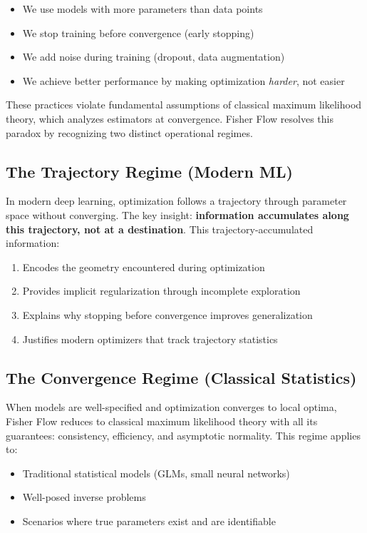\documentclass[11pt]{article}
\begin{document}
\begin{itemize}
\item We use models with more parameters than data points
\item We stop training before convergence (early stopping)
\item We add noise during training (dropout, data augmentation)
\item We achieve better performance by making optimization \emph{harder}, not easier
\end{itemize}

These practices violate fundamental assumptions of classical maximum likelihood theory, which analyzes estimators at convergence. Fisher Flow resolves this paradox by recognizing two distinct operational regimes.

\subsection{The Trajectory Regime (Modern ML)}

In modern deep learning, optimization follows a trajectory through parameter space without converging. The key insight: \textbf{information accumulates along this trajectory, not at a destination}. This trajectory-accumulated information:

\begin{enumerate}
\item Encodes the geometry encountered during optimization
\item Provides implicit regularization through incomplete exploration
\item Explains why stopping before convergence improves generalization
\item Justifies modern optimizers that track trajectory statistics
\end{enumerate}

\subsection{The Convergence Regime (Classical Statistics)}

When models are well-specified and optimization converges to local optima, Fisher Flow reduces to classical maximum likelihood theory with all its guarantees: consistency, efficiency, and asymptotic normality. This regime applies to:
\begin{itemize}
\item Traditional statistical models (GLMs, small neural networks)
\item Well-posed inverse problems
\item Scenarios where true parameters exist and are identifiable
\end{itemize}
\end{document}
